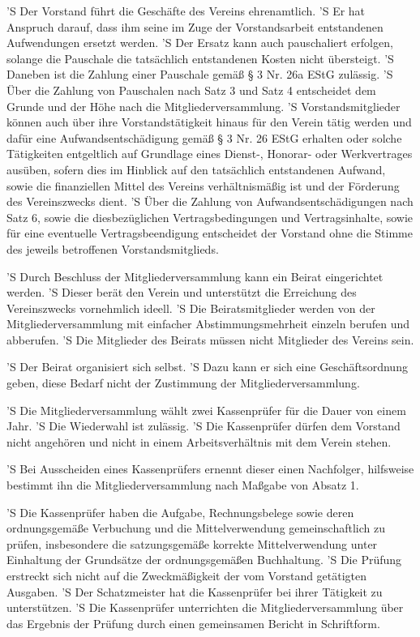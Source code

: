 \documentclass[a4paper,10pt]{scrreprt}
\begin{document}
\begin{contract}
'S Der Vorstand führt die Geschäfte des Vereins ehrenamtlich.
'S Er hat Anspruch darauf, dass ihm seine im Zuge der Vorstandsarbeit
entstandenen Aufwendungen ersetzt werden.
'S Der Ersatz kann auch pauschaliert erfolgen, solange die Pauschale die
tatsächlich entstandenen Kosten nicht übersteigt.
'S Daneben ist die Zahlung einer Pauschale gemäß § 3 Nr. 26a EStG zulässig.
'S Über die Zahlung von Pauschalen nach Satz 3 und Satz 4 entscheidet dem
Grunde und der Höhe nach die Mitgliederversammlung.
'S Vorstandsmitglieder können auch über ihre Vorstandstätigkeit hinaus für den
Verein tätig werden und dafür eine Aufwandsentschädigung gemäß § 3 Nr. 26 EStG
erhalten oder solche Tätigkeiten entgeltlich auf Grundlage eines Dienst-,
Honorar- oder Werkvertrages ausüben, sofern dies im Hinblick auf den tatsächlich
entstandenen Aufwand, sowie die finanziellen Mittel des Vereins verhältnismäßig
ist und der Förderung des Vereinszwecks dient.
'S Über die Zahlung von Aufwandsentschädigungen nach Satz 6, sowie die
diesbezüglichen Vertragsbedingungen und Vertragsinhalte, sowie für eine
eventuelle Vertragsbeendigung entscheidet der Vorstand ohne die Stimme des
jeweils betroffenen Vorstandsmitglieds.


'S Durch Beschluss der Mitgliederversammlung kann ein Beirat eingerichtet
werden.
'S Dieser berät den Verein und unterstützt die Erreichung des Vereinszwecks
vornehmlich ideell.
'S Die Beiratsmitglieder werden von der Mitgliederversammlung mit einfacher
Abstimmungsmehrheit einzeln berufen und abberufen.
'S Die Mitglieder des Beirats müssen nicht Mitglieder des Vereins sein.

'S Der Beirat organisiert sich selbst.
'S Dazu kann er sich eine Geschäftsordnung geben, diese Bedarf nicht der
Zustimmung der Mitgliederversammlung.


'S Die Mitgliederversammlung wählt zwei Kassenprüfer für die Dauer von einem
Jahr.
'S Die Wiederwahl ist zulässig.
'S Die Kassenprüfer dürfen dem Vorstand nicht angehören und nicht in einem
Arbeitsverhältnis mit dem Verein stehen.

'S Bei Ausscheiden eines Kassenprüfers ernennt dieser einen Nachfolger,
hilfsweise bestimmt ihn die Mitgliederversammlung nach Maßgabe von Absatz 1.

'S Die Kassenprüfer haben die Aufgabe, Rechnungsbelege sowie deren
ordnungsgemäße Verbuchung und die Mittelverwendung gemeinschaftlich zu prüfen,
insbesondere die satzungsgemäße korrekte Mittelverwendung unter Einhaltung der
Grundsätze der ordnungsgemäßen Buchhaltung.
'S Die Prüfung erstreckt sich nicht auf die Zweckmäßigkeit der vom Vorstand
getätigten Ausgaben.
'S Der Schatzmeister hat die Kassenprüfer bei ihrer Tätigkeit zu unterstützen.
'S Die Kassenprüfer unterrichten die Mitgliederversammlung über das Ergebnis
der Prüfung durch einen gemeinsamen Bericht in Schriftform.


\end{contract}
\end{document}
